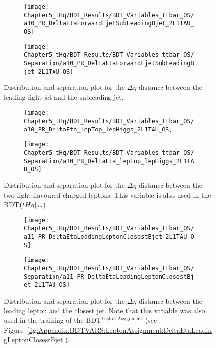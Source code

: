 \begin{figure}[h]
\centering
\begin{subfigure}{.45\textwidth}
  \centering
  \texttt{[image: Chapter5\_tHq/BDT\_Results/BDT\_Variables\_ttbar\_OS/a10\_PR\_DeltaEtaForwardLjetSubLeadingBjet\_2L1TAU\_OS]}
\end{subfigure}%
\begin{subfigure}{.55\textwidth}
  \centering
  \texttt{[image: Chapter5\_tHq/BDT\_Results/BDT\_Variables\_ttbar\_OS/Separation/a10\_PR\_DeltaEtaForwardLjetSubLeadingBjet\_2L1TAU\_OS]}
\end{subfigure}
\caption{Distribution and separation plot for the $\Delta \eta$ distance between the leading light jet and the subleading \btagged jet.}
\label{fig:Appendix:BDTVARS:ttbarOS:a10_PR_DeltaEtaForwardLjetSubLeadingBjet}
\end{figure}

\begin{figure}[h]
\centering
\begin{subfigure}{.45\textwidth}
  \centering
  \texttt{[image: Chapter5\_tHq/BDT\_Results/BDT\_Variables\_ttbar\_OS/a10\_PR\_DeltaEta\_lepTop\_lepHiggs\_2L1TAU\_OS]}
\end{subfigure}%
\begin{subfigure}{.55\textwidth}
  \centering
  \texttt{[image: Chapter5\_tHq/BDT\_Results/BDT\_Variables\_ttbar\_OS/Separation/a10\_PR\_DeltaEta\_lepTop\_lepHiggs\_2L1TAU\_OS]}
\end{subfigure}
\caption{Distribution and separation plot for the $\Delta \eta$ distance between the two light-flavoured-charged leptons. This
variable is also used in the BDT$(tHq|_{\text{SS}})$.}
\label{fig:Appendix:BDTVARS:ttbarOS:a10_PR_DeltaEta_lepTop_lepHiggs}
\end{figure}

\begin{figure}[h]
\centering
\begin{subfigure}{.45\textwidth}
  \centering
  \texttt{[image: Chapter5\_tHq/BDT\_Results/BDT\_Variables\_ttbar\_OS/a11\_PR\_DeltaEtaLeadingLeptonClosestBjet\_2L1TAU\_OS]}
\end{subfigure}%
\begin{subfigure}{.55\textwidth}
  \centering
  \texttt{[image: Chapter5\_tHq/BDT\_Results/BDT\_Variables\_ttbar\_OS/Separation/a11\_PR\_DeltaEtaLeadingLeptonClosestBjet\_2L1TAU\_OS]}
\end{subfigure}
\caption{Distribution and separation plot for the $\Delta \eta$ distance between the leading lepton and the closest \btagged jet. Note
that this variable was also used in the training of the BDT$^{\text{Lepton Assignment}}$
(see Figure~\ref{fig:Appendix:BDTVARS:LeptonAssignment:DeltaEtaLeadingLeptonClosestBjet}).}
\label{fig:Appendix:BDTVARS:ttbarOS:a11_PR_DeltaEtaLeadingLeptonClosestBjet}
\end{figure}


